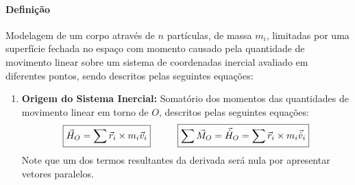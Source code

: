 \documentclass{article}
\begin{document}
            \paragraph{Definição}Modelagem de um corpo através de $n$ partículas, de massa $m_{i}$, limitadas por uma superfície fechada no espaço com momento causado pela quantidade de movimento linear sobre um sistema de coordenadas inercial avaliado em diferentes pontos, sendo descritos pelas seguintes equações:
                \begin{enumerate}[rightmargin = \leftmargin]
                    \item \textbf{Origem do Sistema Inercial:} Somatório dos momentos das quantidades de movimento linear em torno de $O$, descritos pelas seguintes equações:
                        \begin{equation}
                            \boxed{
                                \vec{H}_{O} = \sum \vec{r}_{i}\times m_{i}\vec{v}_{i}
                            }
                            \hspace{10mm}
                            \boxed{
                                \sum\vec{M}_{O} = \vec{\dot{H}}_{O} = \sum \vec{r}_{i}\times m_{i}\vec{\dot{v}}_{i}
                            }
                        \end{equation}
                    Note que um dos termos resultantes da derivada será nula por apresentar vetores paralelos.


\end{enumerate}
\end{document}
